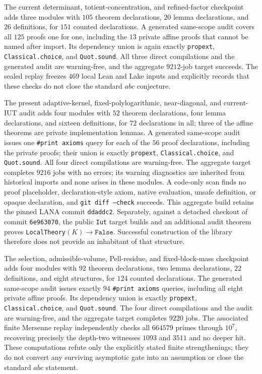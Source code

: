 \documentclass[11pt]{amsart}
\theoremstyle{definition}
\theoremstyle{remark}
\begin{document}
The current determinant, totient-concentration, and refined-factor checkpoint
adds three modules with $105$ theorem declarations, $20$ lemma declarations,
and $26$ definitions, for $151$ counted declarations.  A generated
same-scope audit covers all $125$ proofs one for one, including the $13$
private affine proofs that cannot be named after import.  Its dependency union
is again exactly \texttt{propext}, \texttt{Classical.choice}, and
\texttt{Quot.sound}.  All three direct compilations and the generated audit
are warning-free, and the aggregate $9212$-job target succeeds.  The sealed
replay freezes $469$ local Lean and Lake inputs and explicitly records that
these checks do not close the standard $abc$ conjecture.

The present adaptive-kernel, fixed-polylogarithmic, near-diagonal, and
current-IUT audit adds four modules with $52$ theorem declarations, four
lemma declarations, and sixteen definitions, for $72$ declarations in all;
three of the affine theorems are private implementation lemmas.  A generated
same-scope audit issues one \texttt{\#print axioms} query for each of the $56$
proof declarations, including the private proofs; their union is exactly
\texttt{propext}, \texttt{Classical.choice}, and \texttt{Quot.sound}.
All four direct compilations are warning-free.  The aggregate target
completes $9216$ jobs with no errors; its warning diagnostics are inherited
from historical imports and none arises in these modules.  A code-only scan
finds no proof placeholder, declaration-style axiom, native evaluation,
unsafe definition, or opaque declaration, and \texttt{git diff --check}
succeeds.  This aggregate build retains the pinned LANA commit
\texttt{ddaddc2}.  Separately, against a
detached checkout of commit \texttt{6e963070}, the public \texttt{Iut}
target builds and an additional audit theorem proves
\texttt{LocalTheory}$(K)\to\texttt{False}$.  Successful construction of the
library therefore does not provide an inhabitant of that structure.

The selection, admissible-volume, Pell-residue, and fixed-block-mass
checkpoint adds four modules with $92$ theorem declarations, two lemma
declarations, $22$ definitions, and eight structures, for $124$ counted
declarations.  The generated same-scope audit issues exactly $94$
\texttt{\#print axioms} queries, including all eight private affine proofs.
Its dependency union is exactly \texttt{propext},
\texttt{Classical.choice}, and \texttt{Quot.sound}.  The four direct
compilations and the audit are warning-free, and the aggregate target
completes $9220$ jobs.  The associated finite Mersenne replay independently
checks all $664579$ primes through $10^7$, recovering precisely the depth-two
witnesses $1093$ and $3511$ and no deeper hit.  These computations refute
only the explicitly stated finite strengthenings; they do not convert any
surviving asymptotic gate into an assumption or close the standard $abc$
statement.
\end{document}
